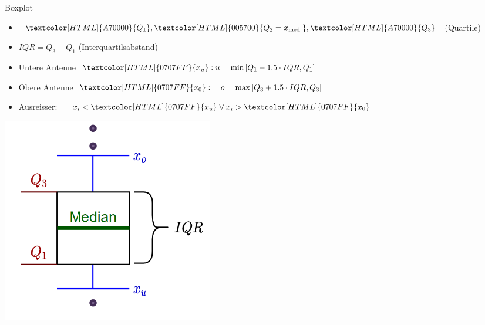 \begin{definition}{Boxplot}\\
\begin{minipage}{0.6\columnwidth}
\begin{itemize}
  \setlength{\itemsep}{5pt}
  \item $\textcolor[HTML]{A70000}{Q_{1}},\textcolor[HTML]{005700}{ Q_{2}=x_{\text {med }}},\textcolor[HTML]{A70000}{ Q_{3}}$ (Quartile)
  \item $I Q R=Q_{3}-Q_{1}$ (Interquartilsabstand)
  \item Untere Antenne $\textcolor[HTML]{0707FF}{x_{u}}:\\ u=\min \left[Q_{1}-1.5 \cdot I Q R, Q_{1}\right]$
  \item Obere Antenne $\textcolor[HTML]{0707FF}{x_{0}}:\\ \quad o=\max \left[Q_{3}+1.5 \cdot I Q R, Q_{3}\right]$
  \item Ausreisser: $\quad x_{i}<\textcolor[HTML]{0707FF}{x_{u}} \vee x_{i}>\textcolor[HTML]{0707FF}{x_{0}}$
\end{itemize}
\end{minipage}%
\begin{minipage}{0.4\columnwidth}
  \includegraphics[width=\textwidth]{images/boxplot.png}
\end{minipage}
\end{definition}

